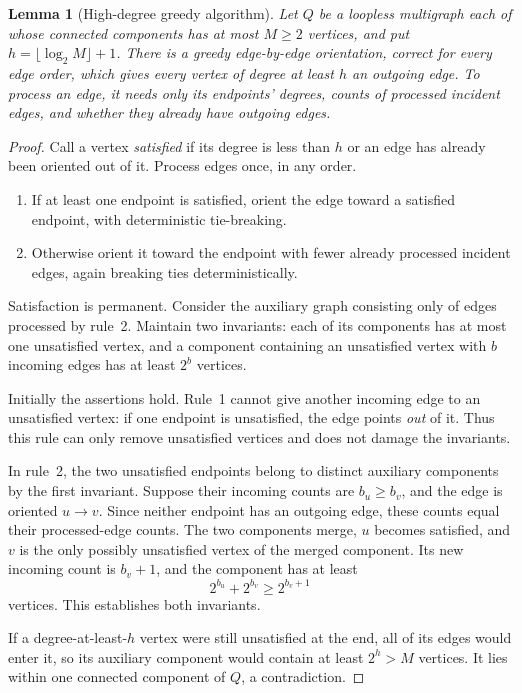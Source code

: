 \documentclass[11pt]{article}
\newtheorem{lemma}[theorem]{Lemma}
\theoremstyle{definition}
\begin{document}
\begin{lemma}[High-degree greedy algorithm]\label{lem:high-degree}
Let $Q$ be a loopless multigraph each of whose connected components has at
most $M\ge2$ vertices, and put $h=\lfloor\log_2 M\rfloor+1$. There is a
greedy edge-by-edge orientation, correct for every edge order, which gives
every vertex of degree at least $h$ an outgoing edge. To process an edge,
it needs only its endpoints' degrees, counts of processed incident edges,
and whether they already have outgoing edges.
\end{lemma}
\begin{proof}
Call a vertex \emph{satisfied} if its degree is less than $h$ or an edge has
already been oriented out of it. Process edges once, in any order.
\begin{enumerate}
\item If at least one endpoint is satisfied, orient the edge toward a
satisfied endpoint, with deterministic tie-breaking.
\item Otherwise orient it toward the endpoint with fewer already processed
incident edges, again breaking ties deterministically.
\end{enumerate}
Satisfaction is permanent. Consider the auxiliary graph consisting only of
edges processed by rule~2. Maintain two invariants: each of its components
has at most one unsatisfied vertex, and a component containing an unsatisfied
vertex with $b$ incoming edges has at least $2^b$ vertices.

Initially the assertions hold. Rule~1 cannot give another incoming edge to
an unsatisfied vertex: if one endpoint is unsatisfied, the edge points
\emph{out} of it. Thus this rule can only remove unsatisfied vertices and
does not damage the invariants.

In rule~2, the two unsatisfied endpoints belong to distinct auxiliary
components by the first invariant. Suppose their incoming counts are
$b_u\ge b_v$, and the edge is oriented $u\to v$. Since neither endpoint
has an outgoing edge, these counts equal their processed-edge counts.
The two components merge, $u$ becomes satisfied, and $v$ is the only
possibly unsatisfied vertex of the merged component. Its new incoming
count is $b_v+1$, and the component has at least
\[
 2^{b_u}+2^{b_v}\ge 2^{b_v+1}
\]
vertices. This establishes both invariants.

If a degree-at-least-$h$ vertex were still unsatisfied at the end, all of
its edges would enter it, so its auxiliary component would contain at least
$2^h>M$ vertices. It lies within one connected component of $Q$, a
contradiction.
\end{proof}
\end{document}
